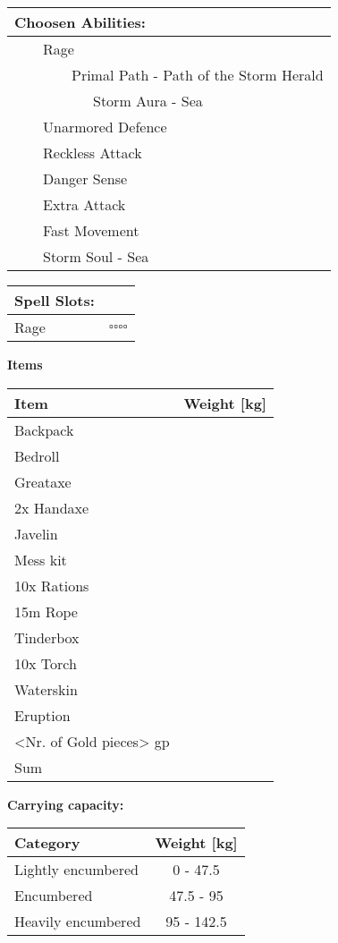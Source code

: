 \documentclass[11pt]{article}
\newcommand{\available}{$\square$}
\newcommand{\tabitem}{~~\llap{--}~~}
\newcommand{\tabtabitem}{~~~~~~\llap{$\bullet$}~~}
\newcommand{\tabtabtabitem}{~~~~~~~~~\llap{$\star$}~~}
\begin{document}
\begin{multicols}{2}
\vspace{4mm}

\noindent \begin{tabularx}{95mm}{@{}l}
{\Large \textbf{Choosen Abilities:}} \\
\hline
\tabitem Rage \\
\tabtabitem Primal Path - Path of the Storm Herald \\
\tabtabtabitem Storm Aura - Sea \\
\tabitem Unarmored Defence \\
\tabitem Reckless Attack \\
\tabitem Danger Sense \\
\tabitem Extra Attack \\
\tabitem Fast Movement \\
\tabitem Storm Soul - Sea
		\end{tabularx}

\vspace{4mm}

\noindent \begin{tabularx}{95mm}{@{}l c}
{\Large \textbf{Spell Slots:}} & \\
\hline
Rage	& \available \available \available \available
		\end{tabularx}
	\end{multicols}

\clearpage

	\begin{center}
{\LARGE \textbf{Items}}
	\end{center}

	\begin{tabularx}{\textwidth}{X|r}
Item & Weight [kg] \\
\hline
Backpack									&			\\
Bedroll										&			\\
Greataxe									&			\\
2x Handaxe									&			\\
Javelin										&			\\
Mess kit									&			\\
10x Rations									&			\\
15m Rope									&			\\
Tinderbox									&			\\
10x Torch									&			\\
Waterskin									&			\\
Eruption									&			\\
<Nr. of Gold pieces> gp 					& 			\\
\hline
Sum 										&
	\end{tabularx}

\vspace{10mm}

\textbf{Carrying capacity:} \\

	\begin{tabular}{l|c}
Category & Weight [kg] \\
\hline
Lightly encumbered 	& 0 - 47.5 	\\
Encumbered 			& 47.5 - 95 \\
Heavily encumbered	& 95 - 142.5
	\end{tabular}
\end{document}
